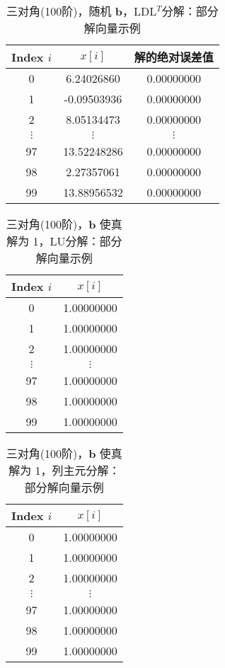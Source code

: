 \documentclass[UTF8]{ctexart}
\begin{document}
  \begin{table}[ht]
  \centering
  \caption{三对角(100阶)，随机 $\mathbf{b}$，LDL$^T$分解：部分解向量示例}
  \label{tab:tri100-randb-LDLT}
  \begin{tabular}{ccc}
  \toprule
  \textbf{Index} $i$ & $x[i]$ & 解的绝对误差值\\
  \midrule
  0   &  6.24026860  & 0.00000000\\
  1   &  -0.09503936  & 0.00000000\\
  2   &  8.05134473  & 0.00000000\\
  $\vdots$ & $\vdots$ & $\vdots$\\
  97  &  13.52248286  & 0.00000000\\
  98  &  2.27357061  & 0.00000000\\
  99  &  13.88956532  & 0.00000000\\
  \bottomrule
  \end{tabular}
  \end{table}
  
  \begin{table}[ht]
  \centering
  \caption{三对角(100阶)，$\mathbf{b}$ 使真解为 1，LU分解：部分解向量示例}
  \label{tab:tri100-onesolution-LU}
  \begin{tabular}{cc}
  \toprule
  \textbf{Index} $i$ & $x[i]$ \\
  \midrule
  0   &  1.00000000  \\
  1   &  1.00000000  \\
  2   &  1.00000000  \\
  $\vdots$ & $\vdots$ \\
  97  &  1.00000000 \\
  98  &  1.00000000  \\
  99  &  1.00000000  \\
  \bottomrule
  \end{tabular}
  \end{table}
  
  \begin{table}[ht]
  \centering
  \caption{三对角(100阶)，$\mathbf{b}$ 使真解为 1，列主元分解：部分解向量示例}
  \label{tab:tri100-onesolution-partialPivot}
  \begin{tabular}{cc}
  \toprule
  \textbf{Index} $i$ & $x[i]$ \\
  \midrule
  0   &  1.00000000  \\
  1   &  1.00000000 \\
  2   &  1.00000000  \\
  $\vdots$ & $\vdots$ \\
  97  &  1.00000000 \\
  98  &  1.00000000  \\
  99  &  1.00000000  \\
  \bottomrule
  \end{tabular}
  \end{table}
  
\end{document}
